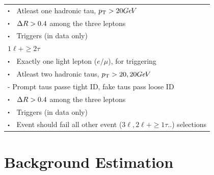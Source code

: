 \documentclass[letterpaper,12pt]{article}
\newcommand\sbullet[1][.5]{\mathbin{\vcenter{\hbox{\scalebox{#1}{$\bullet$}}}}}  %
\newcommand{\GeV}{{Ge\kern -0.1em V}}
\begin{document}
\begin{table}
{\begin{tabular}{l}
    $\sbullet \hspace{0.2cm}$ Atleast one hadronic tau, $\pt>20 \GeV$\\
    $\sbullet \hspace{0.2cm}$ $\Delta R>0.4$ among the three leptons\\
    $\sbullet \hspace{0.2cm}$ Triggers (in data only)\\
    \hline
    \centerline{$1\ell + \geq2\tau$}\\
    \hline
    $\sbullet \hspace{0.2cm}$ Exactly one light lepton ($e/\mu$), for triggering\\
    $\sbullet \hspace{0.2cm}$ Atleast two hadronic taus, $\pt>20,20 \GeV$\\
    \hspace{1cm}- Prompt taus passe tight ID, fake taus pass loose ID\\
    $\sbullet \hspace{0.2cm}$ $\Delta R>0.4$ among the three leptons\\
    $\sbullet \hspace{0.2cm}$ Triggers (in data only)\\
    $\sbullet \hspace{0.2cm}$ Event should fail all other event ($3\ell,2\ell+\geq1\tau..$) selections\\
    \hline \hline
    \end{tabular}%
  }
  \label{tab:eventsel}
\end{table}

\section{Background Estimation}
\label{sec:bkgs}
\end{document}
